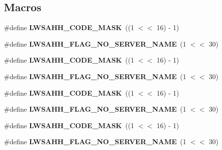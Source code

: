 \subsection*{Macros}
\begin{DoxyCompactItemize}
\item 
\mbox{\label{group__HTTP-headers-create_ga6e47044becc8d711dc5e619e1e5a0058}} 
\#define {\bfseries L\+W\+S\+A\+H\+H\+\_\+\+C\+O\+D\+E\+\_\+\+M\+A\+SK}~((1 $<$$<$ 16) -\/ 1)
\item 
\mbox{\label{group__HTTP-headers-create_ga96942f8dbde926a4cf9f9e56a4e10ee3}} 
\#define {\bfseries L\+W\+S\+A\+H\+H\+\_\+\+F\+L\+A\+G\+\_\+\+N\+O\+\_\+\+S\+E\+R\+V\+E\+R\+\_\+\+N\+A\+ME}~(1 $<$$<$ 30)
\item 
\mbox{\label{group__HTTP-headers-create_ga6e47044becc8d711dc5e619e1e5a0058}} 
\#define {\bfseries L\+W\+S\+A\+H\+H\+\_\+\+C\+O\+D\+E\+\_\+\+M\+A\+SK}~((1 $<$$<$ 16) -\/ 1)
\item 
\mbox{\label{group__HTTP-headers-create_ga96942f8dbde926a4cf9f9e56a4e10ee3}} 
\#define {\bfseries L\+W\+S\+A\+H\+H\+\_\+\+F\+L\+A\+G\+\_\+\+N\+O\+\_\+\+S\+E\+R\+V\+E\+R\+\_\+\+N\+A\+ME}~(1 $<$$<$ 30)
\item 
\mbox{\label{group__HTTP-headers-create_ga6e47044becc8d711dc5e619e1e5a0058}} 
\#define {\bfseries L\+W\+S\+A\+H\+H\+\_\+\+C\+O\+D\+E\+\_\+\+M\+A\+SK}~((1 $<$$<$ 16) -\/ 1)
\item 
\mbox{\label{group__HTTP-headers-create_ga96942f8dbde926a4cf9f9e56a4e10ee3}} 
\#define {\bfseries L\+W\+S\+A\+H\+H\+\_\+\+F\+L\+A\+G\+\_\+\+N\+O\+\_\+\+S\+E\+R\+V\+E\+R\+\_\+\+N\+A\+ME}~(1 $<$$<$ 30)
\item 
\mbox{\label{group__HTTP-headers-create_ga6e47044becc8d711dc5e619e1e5a0058}} 
\#define {\bfseries L\+W\+S\+A\+H\+H\+\_\+\+C\+O\+D\+E\+\_\+\+M\+A\+SK}~((1 $<$$<$ 16) -\/ 1)
\item 
\mbox{\label{group__HTTP-headers-create_ga96942f8dbde926a4cf9f9e56a4e10ee3}} 
\#define {\bfseries L\+W\+S\+A\+H\+H\+\_\+\+F\+L\+A\+G\+\_\+\+N\+O\+\_\+\+S\+E\+R\+V\+E\+R\+\_\+\+N\+A\+ME}~(1 $<$$<$ 30)

\end{DoxyCompactItemize}
